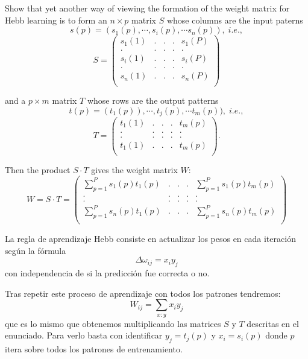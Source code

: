 \begin{problem}[1]\label{ej:3_1}
Show that yet another way of viewing the formation of the weight matrix for Hebb learning is to form an $n\times p$ matrix $S$ whose columns are the input paterns
\[s(p) = (s_1(p),\cdots, s_i(p),\cdots s_n(p)), \; i.e.,\]
\[S = \left( \begin{array}{ccccc}
s_1(1) & . & . & . & s_1(P) \\
. & . & . & . & . \\
s_i(1) & . & . & . & s_i(P) \\
. & . & . & . & . \\
s_n(1) & . & . & . & s_n(P) \\
\end{array}\right)\]

and a $p \times m$ matrix $T$ whose rows are the output patterns
\[t(p) = (t_1(p)), \cdots, t_j(p), \cdots t_m(p)), \; i.e.,\]
\[T = \left( \begin{array}{ccccc}
t_1(1) & . & . & . & t_m(p) \\
. & . & . & . & . \\
. & . & . & . & . \\
t_1(1) & . & . & . & t_m(p) \\
\end{array}\right).\]

Then the product $S\cdot T$ gives the weight matrix $W$:
\[W = S\cdot T =  \left( \begin{array}{ccccc}
\sum_{p=1}^P s_1(p)t_1(p) & . & . & . & \sum_{p=1}^P s_1(p)t_m(p) \\
. & . & . & . & . \\
. & . & . & . & . \\
\sum_{p=1}^P s_n(p)t_1(p) & . & . & . & \sum_{p=1}^P s_n(p)t_m(p) \\
\end{array}\right)\]
\solution


La regla de aprendizaje Hebb consiste en actualizar los pesos en cada iteración según la fórmula
\[Δω_{ij} = x_iy_j\]
con independencia de si la predicción fue correcta o no.

Tras repetir este proceso de aprendizaje con todos los patrones tendremos:
\[W_{ij} = \sum_{x:y} x_iy_j\]
que es lo mismo que obtenemos multiplicando las matrices $S$ y $T$ descritas en el enunciado. Para verlo basta con identificar $y_j = t_j(p)$ y $x_i = s_i(p)$ donde $p$ itera sobre todos los patrones de entrenamiento.

\end{problem}

